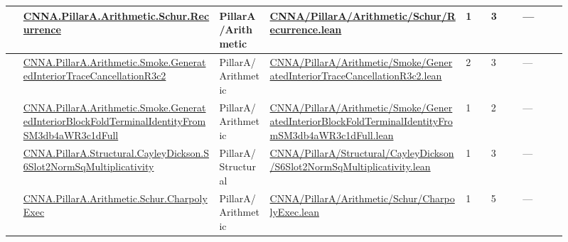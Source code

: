 \begin{longtable}{L{0.025\linewidth} L{0.315\linewidth} L{0.08\linewidth} L{0.315\linewidth} L{0.045\linewidth} L{0.055\linewidth} L{0.07\linewidth}}
\hline
{} & \href{run:repo_snapshot/CNNA/PillarA/Arithmetic/Schur/Recurrence.lean}{CNNA.\allowbreak{}PillarA.\allowbreak{}Arithmetic.\allowbreak{}Schur.\allowbreak{}Recurrence} & PillarA/\allowbreak{}Arithmetic & \href{run:repo_snapshot/CNNA/PillarA/Arithmetic/Schur/Recurrence.lean}{CNNA/\allowbreak{}PillarA/\allowbreak{}Arithmetic/\allowbreak{}Schur/\allowbreak{}Recurrence.\allowbreak{}lean} & 1 & 3 & ---\\
\hline
{} & \href{run:repo_snapshot/CNNA/PillarA/Arithmetic/Smoke/GeneratedInteriorTraceCancellationR3c2.lean}{CNNA.\allowbreak{}PillarA.\allowbreak{}Arithmetic.\allowbreak{}Smoke.\allowbreak{}GeneratedInteriorTraceCancellationR3c2} & PillarA/\allowbreak{}Arithmetic & \href{run:repo_snapshot/CNNA/PillarA/Arithmetic/Smoke/GeneratedInteriorTraceCancellationR3c2.lean}{CNNA/\allowbreak{}PillarA/\allowbreak{}Arithmetic/\allowbreak{}Smoke/\allowbreak{}GeneratedInteriorTraceCancellationR3c2.\allowbreak{}lean} & 2 & 3 & ---\\
\hline
{} & \href{run:repo_snapshot/CNNA/PillarA/Arithmetic/Smoke/GeneratedInteriorBlockFoldTerminalIdentityFromSM3db4aWR3c1dFull.lean}{CNNA.\allowbreak{}PillarA.\allowbreak{}Arithmetic.\allowbreak{}Smoke.\allowbreak{}GeneratedInteriorBlockFoldTerminalIdentityFromSM3db4aWR3c1dFull} & PillarA/\allowbreak{}Arithmetic & \href{run:repo_snapshot/CNNA/PillarA/Arithmetic/Smoke/GeneratedInteriorBlockFoldTerminalIdentityFromSM3db4aWR3c1dFull.lean}{CNNA/\allowbreak{}PillarA/\allowbreak{}Arithmetic/\allowbreak{}Smoke/\allowbreak{}GeneratedInteriorBlockFoldTerminalIdentityFromSM3db4aWR3c1dFull.\allowbreak{}lean} & 1 & 2 & ---\\
\hline
{} & \href{run:repo_snapshot/CNNA/PillarA/Structural/CayleyDickson/S6Slot2NormSqMultiplicativity.lean}{CNNA.\allowbreak{}PillarA.\allowbreak{}Structural.\allowbreak{}CayleyDickson.\allowbreak{}S6Slot2NormSqMultiplicativity} & PillarA/\allowbreak{}Structural & \href{run:repo_snapshot/CNNA/PillarA/Structural/CayleyDickson/S6Slot2NormSqMultiplicativity.lean}{CNNA/\allowbreak{}PillarA/\allowbreak{}Structural/\allowbreak{}CayleyDickson/\allowbreak{}S6Slot2NormSqMultiplicativity.\allowbreak{}lean} & 1 & 3 & ---\\
\hline
{} & \href{run:repo_snapshot/CNNA/PillarA/Arithmetic/Schur/CharpolyExec.lean}{CNNA.\allowbreak{}PillarA.\allowbreak{}Arithmetic.\allowbreak{}Schur.\allowbreak{}CharpolyExec} & PillarA/\allowbreak{}Arithmetic & \href{run:repo_snapshot/CNNA/PillarA/Arithmetic/Schur/CharpolyExec.lean}{CNNA/\allowbreak{}PillarA/\allowbreak{}Arithmetic/\allowbreak{}Schur/\allowbreak{}CharpolyExec.\allowbreak{}lean} & 1 & 5 & ---\\

\end{longtable}

